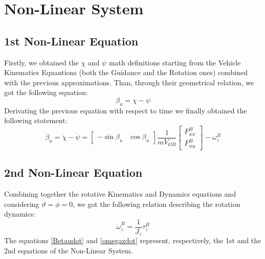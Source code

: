 \documentclass[a4paper,12pt,titlepage]{report}
\numberwithin{figure}{section}
\begin{document}
\section{Non-Linear System}
	\subsection{1st Non-Linear Equation} 	
		Firstly, we obtained the $\chi$ and $\psi$ math definitions starting from the Vehicle Kinematics Equantions (both the Guidance and the Rotation ones) combined with the previous approximations. Than, through their geometrical relation, we got the following equation:
			\begin{equation}
				\beta_{u} = \chi - \psi
			\end{equation}
			Derivating the previous equation with respect to time we finally obtained the following statement:
			\begin{equation} \label{Betaudot}
				\dot{\beta}_{u} = \dot\chi - \dot\psi = 
				\begin{bmatrix}
				- \sin\beta_{u} & \cos\beta_{u}
				\end{bmatrix}
				\frac{1}{mV_{OB}}
				\begin{bmatrix}
				F_{wx}^{B} \\ F_{wy}^{B}
				\end{bmatrix}
				-\omega_{z}^{B}
			\end{equation}
	\subsection{2nd Non-Linear Equation}
		Combining together the rotative Kinematics and Dynamics equations and considering $\vartheta = \phi = 0$, we got the following relation describing the rotation dynamics:
			\begin{equation} \label{omegazdot}
				\dot{\omega}_{z}^{B} = \frac{1}{J_{z}} \tau_{z}^{B}
			\end{equation}
		The equations \ref{Betaudot} and \ref{omegazdot} represent, respectively, the 1st and the 2nd equations of the Non-Linear System.
\end{document}
